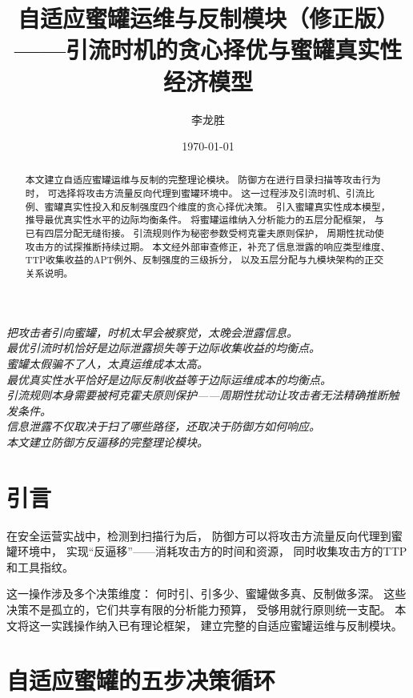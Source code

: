 \documentclass[11pt,a4paper]{article}
\title{自适应蜜罐运维与反制模块（修正版）\\
——引流时机的贪心择优与蜜罐真实性经济模型}
\author{李龙胜}
\date{\today}
\begin{document}
\maketitle

\begin{center}
\textit{
把攻击者引向蜜罐，时机太早会被察觉，太晚会泄露信息。\\
最优引流时机恰好是边际泄露损失等于边际收集收益的均衡点。\\
蜜罐太假骗不了人，太真运维成本太高。\\
最优真实性水平恰好是边际反制收益等于边际运维成本的均衡点。\\
引流规则本身需要被柯克霍夫原则保护——周期性扰动让攻击者无法精确推断触发条件。\\
信息泄露不仅取决于扫了哪些路径，还取决于防御方如何响应。\\
本文建立防御方反逼移的完整理论模块。
}
\end{center}

\vspace{5mm}

\begin{abstract}
本文建立自适应蜜罐运维与反制的完整理论模块。
防御方在进行目录扫描等攻击行为时，
可选择将攻击方流量反向代理到蜜罐环境中。
这一过程涉及引流时机、引流比例、蜜罐真实性投入和反制强度四个维度的贪心择优决策。
引入蜜罐真实性成本模型，
推导最优真实性水平的边际均衡条件。
将蜜罐运维纳入分析能力的五层分配框架，
与已有四层分配无缝衔接。
引流规则作为秘密参数受柯克霍夫原则保护，
周期性扰动使攻击方的试探推断持续过期。
本文经外部审查修正，补充了信息泄露的响应类型维度、
TTP收集收益的APT例外、反制强度的三级拆分，
以及五层分配与九模块架构的正交关系说明。
\end{abstract}

\tableofcontents

\section{引言}

在安全运营实战中，检测到扫描行为后，
防御方可以将攻击方流量反向代理到蜜罐环境中，
实现“反逼移”——消耗攻击方的时间和资源，
同时收集攻击方的TTP和工具指纹。

这一操作涉及多个决策维度：
何时引、引多少、蜜罐做多真、反制做多深。
这些决策不是孤立的，它们共享有限的分析能力预算，
受够用就行原则统一支配。
本文将这一实践操作纳入已有理论框架，
建立完整的自适应蜜罐运维与反制模块。

\section{自适应蜜罐的五步决策循环}
\end{document}

